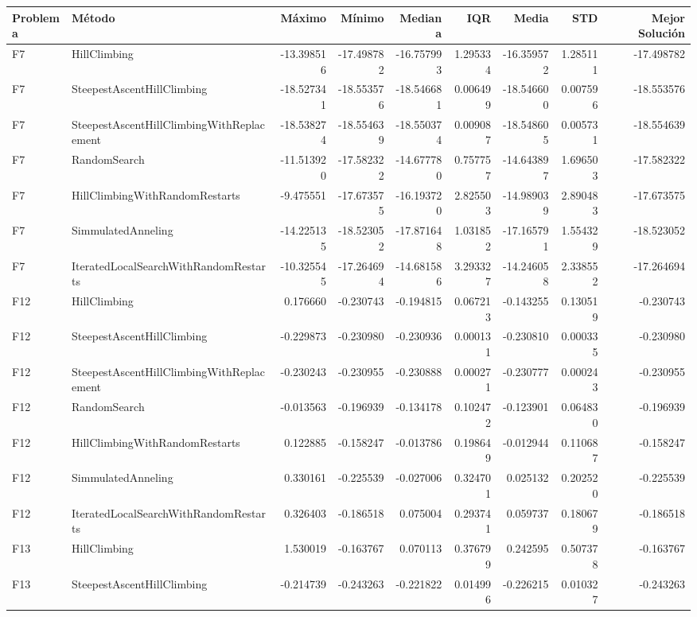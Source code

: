 \begin{tabular}{llrrrrrrr}
\toprule
Problema & Método & Máximo & Mínimo & Mediana & IQR & Media & STD & Mejor Solución \\
\midrule
F7 & HillClimbing & -13.398516 & -17.498782 & -16.757993 & 1.295334 & -16.359572 & 1.285111 & -17.498782 \\
F7 & SteepestAscentHillClimbing & -18.527341 & -18.553576 & -18.546681 & 0.006499 & -18.546600 & 0.007596 & -18.553576 \\
F7 & SteepestAscentHillClimbingWithReplacement & -18.538274 & -18.554639 & -18.550374 & 0.009087 & -18.548605 & 0.005731 & -18.554639 \\
F7 & RandomSearch & -11.513920 & -17.582322 & -14.677780 & 0.757757 & -14.643897 & 1.696503 & -17.582322 \\
F7 & HillClimbingWithRandomRestarts & -9.475551 & -17.673575 & -16.193720 & 2.825503 & -14.989039 & 2.890483 & -17.673575 \\
F7 & SimmulatedAnneling & -14.225135 & -18.523052 & -17.871648 & 1.031852 & -17.165791 & 1.554329 & -18.523052 \\
F7 & IteratedLocalSearchWithRandomRestarts & -10.325545 & -17.264694 & -14.681586 & 3.293327 & -14.246058 & 2.338552 & -17.264694 \\
F12 & HillClimbing & 0.176660 & -0.230743 & -0.194815 & 0.067213 & -0.143255 & 0.130519 & -0.230743 \\
F12 & SteepestAscentHillClimbing & -0.229873 & -0.230980 & -0.230936 & 0.000131 & -0.230810 & 0.000335 & -0.230980 \\
F12 & SteepestAscentHillClimbingWithReplacement & -0.230243 & -0.230955 & -0.230888 & 0.000271 & -0.230777 & 0.000243 & -0.230955 \\
F12 & RandomSearch & -0.013563 & -0.196939 & -0.134178 & 0.102472 & -0.123901 & 0.064830 & -0.196939 \\
F12 & HillClimbingWithRandomRestarts & 0.122885 & -0.158247 & -0.013786 & 0.198649 & -0.012944 & 0.110687 & -0.158247 \\
F12 & SimmulatedAnneling & 0.330161 & -0.225539 & -0.027006 & 0.324701 & 0.025132 & 0.202520 & -0.225539 \\
F12 & IteratedLocalSearchWithRandomRestarts & 0.326403 & -0.186518 & 0.075004 & 0.293741 & 0.059737 & 0.180679 & -0.186518 \\
F13 & HillClimbing & 1.530019 & -0.163767 & 0.070113 & 0.376799 & 0.242595 & 0.507378 & -0.163767 \\
F13 & SteepestAscentHillClimbing & -0.214739 & -0.243263 & -0.221822 & 0.014996 & -0.226215 & 0.010327 & -0.243263 \\

\end{tabular}
